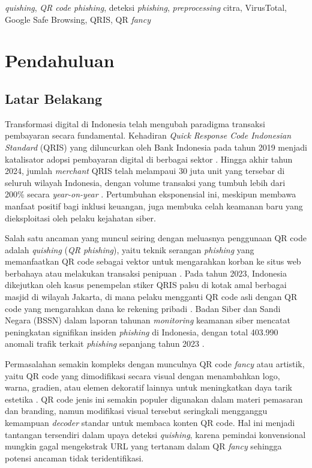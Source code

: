 \documentclass[conference]{IEEEtran}
\begin{document}
\begin{IEEEkeywords}
\textit{quishing}, \textit{QR code phishing}, deteksi \textit{phishing}, \textit{preprocessing} citra, VirusTotal, Google Safe Browsing, QRIS, QR \textit{fancy}
\end{IEEEkeywords}

\section{Pendahuluan}

\subsection{Latar Belakang}

Transformasi digital di Indonesia telah mengubah paradigma transaksi pembayaran secara fundamental. Kehadiran \textit{Quick Response Code Indonesian Standard} (QRIS) yang diluncurkan oleh Bank Indonesia pada tahun 2019 menjadi katalisator adopsi pembayaran digital di berbagai sektor \cite{bi_qris_2019}. Hingga akhir tahun 2024, jumlah \textit{merchant} QRIS telah melampaui 30 juta unit yang tersebar di seluruh wilayah Indonesia, dengan volume transaksi yang tumbuh lebih dari 200\% secara \textit{year-on-year} \cite{bi_statistics_2024}. Pertumbuhan eksponensial ini, meskipun membawa manfaat positif bagi inklusi keuangan, juga membuka celah keamanan baru yang dieksploitasi oleh pelaku kejahatan siber.

Salah satu ancaman yang muncul seiring dengan meluasnya penggunaan QR code adalah \textit{quishing} (\textit{QR phishing}), yaitu teknik serangan \textit{phishing} yang memanfaatkan QR code sebagai vektor untuk mengarahkan korban ke situs web berbahaya atau melakukan transaksi penipuan \cite{sharevski_qr_2022}. Pada tahun 2023, Indonesia dikejutkan oleh kasus penempelan stiker QRIS palsu di kotak amal berbagai masjid di wilayah Jakarta, di mana pelaku mengganti QR code asli dengan QR code yang mengarahkan dana ke rekening pribadi \cite{kompas_qris_2023}. Badan Siber dan Sandi Negara (BSSN) dalam laporan tahunan \textit{monitoring} keamanan siber mencatat peningkatan signifikan insiden \textit{phishing} di Indonesia, dengan total 403.990 anomali trafik terkait \textit{phishing} sepanjang tahun 2023 \cite{bssn_annual_2023}.

Permasalahan semakin kompleks dengan munculnya QR code \textit{fancy} atau artistik, yaitu QR code yang dimodifikasi secara visual dengan menambahkan logo, warna, gradien, atau elemen dekoratif lainnya untuk meningkatkan daya tarik estetika \cite{garateguy_qr_2014}. QR code jenis ini semakin populer digunakan dalam materi pemasaran dan branding, namun modifikasi visual tersebut seringkali mengganggu kemampuan \textit{decoder} standar untuk membaca konten QR code. Hal ini menjadi tantangan tersendiri dalam upaya deteksi \textit{quishing}, karena pemindai konvensional mungkin gagal mengekstrak URL yang tertanam dalam QR \textit{fancy} sehingga potensi ancaman tidak teridentifikasi.
\end{document}

